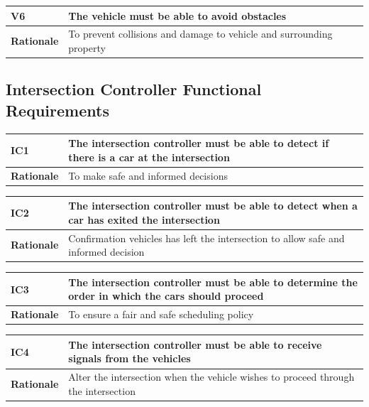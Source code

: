 \documentclass [11pt]{article}
\begin{document}
\begin{longtable}{| p{ } | p{ } | }\hline 
\rowcolor{tableCell}\textbf{V6} & The vehicle must be able to avoid obstacles \\ \hline
\textbf{Rationale} &  To prevent collisions and damage to vehicle and surrounding property\\ \hline 

\end{longtable}







\subsection{Intersection Controller Functional Requirements}
\begin{longtable}{| p{ } | p{ } | }\hline 
\rowcolor{tableCell}\textbf{IC1} & The intersection controller must be able to detect if there is a car at the intersection  \\ \hline
\textbf{Rationale} &  To make safe and informed decisions \\ \hline 
\end{longtable}

\begin{longtable}{| p{ } | p{ } | }\hline 
\rowcolor{tableCell}\textbf{IC2} & The intersection controller must be able to detect when a car has exited the intersection \\ \hline
\textbf{Rationale} &  Confirmation vehicles has left the intersection to allow safe and informed decision \\ \hline 
\end{longtable}

\begin{longtable}{| p{ } | p{ } | }\hline 
\rowcolor{tableCell}\textbf{IC3} & The intersection controller must be able to determine the order in which the cars should proceed \\ \hline
\textbf{Rationale} & To ensure a fair and safe scheduling policy \\ \hline 
\end{longtable}

\begin{longtable}{| p{ } | p{ } | }\hline 
\rowcolor{tableCell}\textbf{IC4} & The intersection controller must be able to receive signals from the vehicles  \\ \hline
\textbf{Rationale} &  Alter the intersection when the vehicle wishes to proceed through the intersection\\ \hline 
\end{longtable}
\end{document}
